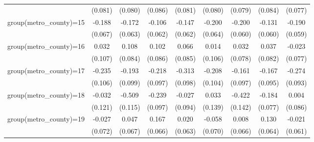 {\begin{tabular}{l*{8}{c}}
                    &     (0.081)         &     (0.080)         &     (0.086)         &     (0.081)         &     (0.080)         &     (0.079)         &     (0.084)         &     (0.077)         \\
group(metro\_county)=15&      -0.188\sym{***}&      -0.172\sym{**} &      -0.106\sym{*}  &      -0.147\sym{**} &      -0.200\sym{***}&      -0.200\sym{***}&      -0.131\sym{**} &      -0.190\sym{***}\\
                    &     (0.067)         &     (0.063)         &     (0.062)         &     (0.062)         &     (0.064)         &     (0.060)         &     (0.060)         &     (0.059)         \\
group(metro\_county)=16&       0.032         &       0.108         &       0.102         &       0.066         &       0.014         &       0.032         &       0.037         &      -0.023         \\
                    &     (0.107)         &     (0.084)         &     (0.086)         &     (0.085)         &     (0.106)         &     (0.078)         &     (0.082)         &     (0.077)         \\
group(metro\_county)=17&      -0.235\sym{**} &      -0.193\sym{*}  &      -0.218\sym{**} &      -0.313\sym{***}&      -0.208\sym{**} &      -0.161\sym{*}  &      -0.167\sym{*}  &      -0.274\sym{***}\\
                    &     (0.106)         &     (0.099)         &     (0.097)         &     (0.098)         &     (0.104)         &     (0.097)         &     (0.095)         &     (0.093)         \\
group(metro\_county)=18&      -0.032         &      -0.509\sym{***}&      -0.239\sym{**} &      -0.027         &       0.033         &      -0.422\sym{***}&      -0.184\sym{**} &       0.004         \\
                    &     (0.121)         &     (0.115)         &     (0.097)         &     (0.094)         &     (0.139)         &     (0.142)         &     (0.077)         &     (0.086)         \\
group(metro\_county)=19&      -0.027         &       0.047         &       0.167\sym{**} &       0.020         &      -0.058         &       0.008         &       0.130\sym{**} &      -0.021         \\
                    &     (0.072)         &     (0.067)         &     (0.066)         &     (0.063)         &     (0.070)         &     (0.066)         &     (0.064)         &     (0.061)         \\

\end{tabular}}
